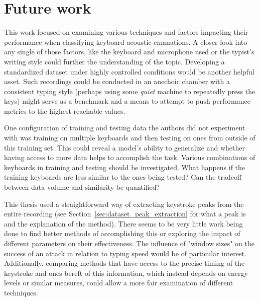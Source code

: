 \documentclass[../main.tex]{subfiles}
\begin{document}
\section{Future work}
This work focused on examining various techniques and factors impacting their performance when classifying keyboard acoustic emanations. 
A closer look into any single of those factors, like the keyboard and microphone used or the typist's writing style
could further the understanding of the topic. 
Developing a standardized dataset under highly controlled conditions would be another helpful asset. 
Such recordings could be conducted in an anechoic chamber with a consistent typing style (perhaps using some
\textit{quiet} machine to repeatedly press the keys) might serve as a benchmark and a means to attempt to push performance metrics to the highest
reachable values.

One configuration of training and testing data the authors did not experiment with was training on multiple 
keyboards and then testing on ones from outside of this training set. This could reveal a model's ability to
generalize and whether having access to more data helps to accomplish the task. Various combinations of keyboards 
in training and testing should be investigated. What happens if the training keyboards are less similar to the ones being tested? Can the tradeoff between data volume and similarity be quantified?

This thesis used a straightforward way of extracting keystroke peaks from the entire recording (see Section~\ref{sec:dataset_peak_extraction}
for what a peak is and the explanation of the method). There seems to be very little work being done to find
better methods of accomplishing this or exploring the impact of different parameters on their effectiveness. 
The influence of "window sizes" on the success of an attack in relation to typing speed would be of particular interest. 
Additionally, comparing methods that have access to the precise timing of the keystroke and ones bereft of this 
information, which instead depends on energy levels or similar measures, could allow a more fair examination of different 
techniques.
\end{document}

